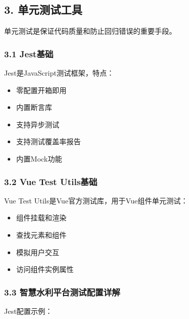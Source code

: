 \subsection{3. 单元测试工具}\label{ux5355ux5143ux6d4bux8bd5ux5de5ux5177}

单元测试是保证代码质量和防止回归错误的重要手段。

\subsubsection{3.1 Jest基础}\label{jestux57faux7840}

Jest是JavaScript测试框架，特点：

\begin{itemize}
\tightlist
\item
  零配置开箱即用
\item
  内置断言库
\item
  支持异步测试
\item
  支持测试覆盖率报告
\item
  内置Mock功能
\end{itemize}

\subsubsection{3.2 Vue Test Utils基础}\label{vue-test-utilsux57faux7840}

Vue Test Utils是Vue官方测试库，用于Vue组件单元测试：

\begin{itemize}
\tightlist
\item
  组件挂载和渲染
\item
  查找元素和组件
\item
  模拟用户交互
\item
  访问组件实例属性
\end{itemize}

\subsubsection{3.3
智慧水利平台测试配置详解}\label{ux667aux6167ux6c34ux5229ux5e73ux53f0ux6d4bux8bd5ux914dux7f6eux8be6ux89e3}

Jest配置示例：

